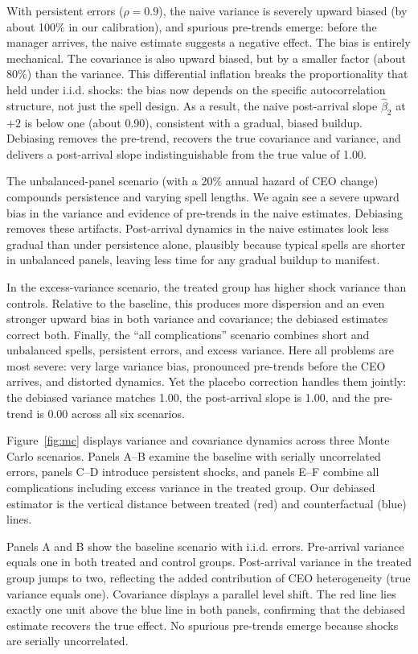 \documentclass[11pt,a4paper]{article}
\begin{document}
With persistent errors ($\rho=0.9$), the naive variance is severely upward biased (by about 100\% in our calibration), and spurious pre-trends emerge: before the manager arrives, the naive estimate suggests a negative effect. The bias is entirely mechanical. The covariance is also upward biased, but by a smaller factor (about 80\%) than the variance. This differential inflation breaks the proportionality that held under i.i.d. shocks: the bias now depends on the specific autocorrelation structure, not just the spell design. As a result, the naive post-arrival slope $\hat\beta_2$ at $+2$ is below one (about 0.90), consistent with a gradual, biased buildup. Debiasing removes the pre-trend, recovers the true covariance and variance, and delivers a post-arrival slope indistinguishable from the true value of 1.00.

The unbalanced-panel scenario (with a 20\% annual hazard of CEO change) compounds persistence and varying spell lengths. We again see a severe upward bias in the variance and evidence of pre-trends in the naive estimates. Debiasing removes these artifacts. Post-arrival dynamics in the naive estimates look less gradual than under persistence alone, plausibly because typical spells are shorter in unbalanced panels, leaving less time for any gradual buildup to manifest.

In the excess-variance scenario, the treated group has higher shock variance than controls. Relative to the baseline, this produces more dispersion and an even stronger upward bias in both variance and covariance; the debiased estimates correct both. Finally, the ``all complications'' scenario combines short and unbalanced spells, persistent errors, and excess variance. Here all problems are most severe: very large variance bias, pronounced pre-trends before the CEO arrives, and distorted dynamics. Yet the placebo correction handles them jointly: the debiased variance matches 1.00, the post-arrival slope is 1.00, and the pre-trend is 0.00 across all six scenarios. 

Figure~\ref{fig:mc} displays variance and covariance dynamics across three Monte Carlo scenarios. Panels A--B examine the baseline with serially uncorrelated errors, panels C--D introduce persistent shocks, and panels E--F combine all complications including excess variance in the treated group. Our debiased estimator is the vertical distance between treated (red) and counterfactual (blue) lines.

Panels A and B show the baseline scenario with i.i.d. errors. Pre-arrival variance equals one in both treated and control groups. Post-arrival variance in the treated group jumps to two, reflecting the added contribution of CEO heterogeneity (true variance equals one). Covariance displays a parallel level shift. The red line lies exactly one unit above the blue line in both panels, confirming that the debiased estimate recovers the true effect. No spurious pre-trends emerge because shocks are serially uncorrelated. 
\end{document}

